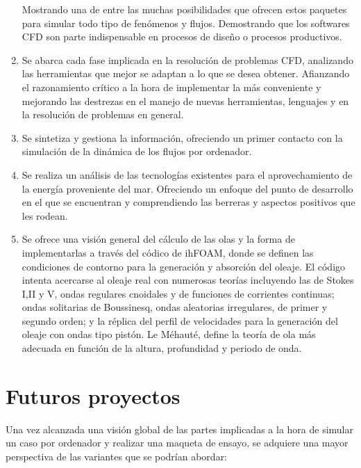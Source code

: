 \begin{enumerate}
  Mostrando una de entre las muchas posibilidades que ofrecen estos
  paquetes para simular todo tipo de fenómenos y flujos. Demostrando que
  los softwares CFD son parte indispensable en procesos de diseño o
  procesos productivos.\\
\item
  Se abarca cada fase implicada en la resolución de problemas CFD,
  analizando las herramientas que mejor se adaptan a lo que se desea
  obtener. Afianzando el razonamiento crítico a la hora de implementar
  la más conveniente y mejorando las destrezas en el manejo de nuevas
  herramientas, lenguajes y en la resolución de problemas en general.
\item
  Se sintetiza y gestiona la información, ofreciendo un primer contacto
  con la simulación de la dinámica de los flujos por ordenador.
\item
  Se realiza un análisis de las tecnologías existentes para el
  aprovechamiento de la energía proveniente del mar. Ofreciendo un
  enfoque del punto de desarrollo en el que se encuentran y
  comprendiendo las berreras y aspectos positivos que les rodean.
\item
  Se ofrece una visión general del cálculo de las olas y la forma de
  implementarlas a través del códico de ihFOAM, donde se definen las
  condiciones de contorno para la generación y absorción del oleaje. El
  código intenta acercarse al oleaje real con numerosas teorías
  incluyendo las de Stokes I,II y V, ondas regulares cnoidales y de
  funciones de corrientes continuas; ondas solitarias de Boussinesq,
  ondas aleatorias irregulares, de primer y segundo orden; y la réplica
  del perfil de velocidades para la generación del oleaje con ondas tipo
  pistón. Le Méhauté, define la teoría de ola más adecuada en función de
  la altura, profundidad y periodo de onda.
\end{enumerate}

\section{Futuros proyectos}\label{sec:futuros}

Una vez alcanzada una visión global de las partes implicadas a la hora
de simular un caso por ordenador y realizar una maqueta de ensayo, se
adquiere una mayor perspectiva de las variantes que se podrían abordar:

